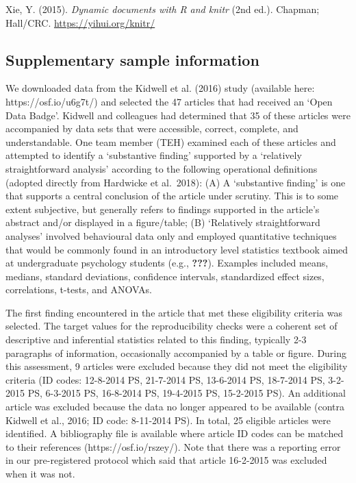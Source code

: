\documentclass[english,,man,floatsintext]{apa6}
\begin{document}
\leavevmode\hypertarget{ref-R-knitr}{}%
Xie, Y. (2015). \emph{Dynamic documents with R and knitr} (2nd ed.). Chapman; Hall/CRC. \url{https://yihui.org/knitr/}

\clearpage
\makeatletter
\efloat@restorefloats
\makeatother


\begin{appendix}
\hypertarget{sup_sample}{%
\section{Supplementary sample information}\label{sup_sample}}

We downloaded data from the Kidwell et al. (2016) study (available here:
https://osf.io/u6g7t/) and selected the 47 articles that had received an
`Open Data Badge'. Kidwell and colleagues had determined that 35 of
these articles were accompanied by data sets that were accessible,
correct, complete, and understandable. One team member (TEH) examined
each of these articles and attempted to identify a `substantive finding'
supported by a `relatively straightforward analysis' according to the
following operational definitions (adopted directly from Hardwicke et
al.~2018): (A) A `substantive finding' is one that supports a central
conclusion of the article under scrutiny. This is to some extent
subjective, but generally refers to findings supported in the article's
abstract and/or displayed in a figure/table; (B) `Relatively
straightforward analyses' involved behavioural data only and employed
quantitative techniques that would be commonly found in an introductory
level statistics textbook aimed at undergraduate psychology students
(e.g., {\textbf{???}}). Examples included means, medians, standard
deviations, confidence intervals, standardized effect sizes,
correlations, t-tests, and ANOVAs.

The first finding encountered in the article that met these eligibility
criteria was selected. The target values for the reproducibility checks
were a coherent set of descriptive and inferential statistics related to
this finding, typically 2-3 paragraphs of information, occasionally
accompanied by a table or figure. During this assessment, 9 articles
were excluded because they did not meet the eligibility criteria (ID
codes: 12-8-2014 PS, 21-7-2014 PS, 13-6-2014 PS, 18-7-2014 PS, 3-2-2015
PS, 6-3-2015 PS, 16-8-2014 PS, 19-4-2015 PS, 15-2-2015 PS). An
additional article was excluded because the data no longer appeared to
be available (contra Kidwell et al., 2016; ID code: 8-11-2014 PS). In
total, 25 eligible articles were identified. A bibliography file is
available where article ID codes can be matched to their references
(https://osf.io/rszey/). Note that there was a reporting error in our
pre-registered protocol which said that article 16-2-2015 was excluded
when it was not.


\end{appendix}
\end{document}
